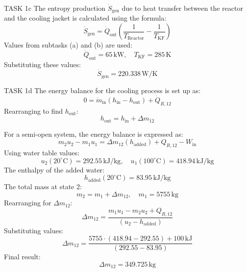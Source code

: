 TASK 1c  
The entropy production \( \dot{S}_{\text{gen}} \) due to heat transfer between the reactor and the cooling jacket is calculated using the formula:  
\[
\dot{S}_{\text{gen}} = \dot{Q}_{\text{out}} \left( \frac{1}{T_{\text{Reactor}}} - \frac{1}{T_{\text{KF}}} \right)
\]  
Values from subtasks (a) and (b) are used:  
\[
\dot{Q}_{\text{out}} = 65 \, \text{kW}, \quad T_{\text{KF}} = 285 \, \text{K}
\]  
Substituting these values:  
\[
\dot{S}_{\text{gen}} = 220.338 \, \text{W/K}
\]  

TASK 1d  
The energy balance for the cooling process is set up as:  
\[
0 = \dot{m}_{\text{in}} (h_{\text{in}} - h_{\text{out}}) + \dot{Q}_{R,12}
\]  
Rearranging to find \( h_{\text{out}} \):  
\[
h_{\text{out}} = h_{\text{in}} + \Delta m_{12}
\]  

For a semi-open system, the energy balance is expressed as:  
\[
m_2 u_2 - m_1 u_1 = \Delta m_{12} (h_{\text{added}}) + Q_{R,12} - W_{\text{in}}
\]  
Using water table values:  
\[
u_2 (20^\circ\text{C}) = 292.55 \, \text{kJ/kg}, \quad u_1 (100^\circ\text{C}) = 418.94 \, \text{kJ/kg}
\]  
The enthalpy of the added water:  
\[
h_{\text{added}} (20^\circ\text{C}) = 83.95 \, \text{kJ/kg}
\]  
The total mass at state 2:  
\[
m_2 = m_1 + \Delta m_{12}, \quad m_1 = 5755 \, \text{kg}
\]  
Rearranging for \( \Delta m_{12} \):  
\[
\Delta m_{12} = \frac{m_1 u_1 - m_2 u_2 + Q_{R,12}}{(u_2 - h_{\text{added}})}
\]  
Substituting values:  
\[
\Delta m_{12} = \frac{5755 \cdot (418.94 - 292.55) + 100 \, \text{kJ}}{(292.55 - 83.95)}
\]  
Final result:  
\[
\Delta m_{12} = 349.725 \, \text{kg}
\]